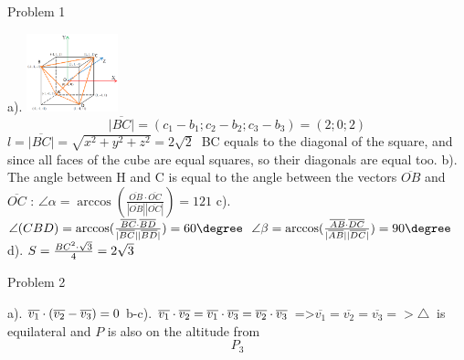 \documentclass[11pt]{article}
\begin{document}
    \begin{center}
        \textrm{Problem 1}
    \end{center}
    \textrm{a).}
    \includegraphics[width=100px]{cube}
    \newline
    \[\overline{|BC|}=(c_{1}-b_{1};c_{2}-b_{2};c_{3}-b_{3})=(2;0;2)\]  \newline
    $ l=\overline{|BC|}=\sqrt{x^2 + y^2 + z^2}=2\sqrt{2}\ $ \newline
    \textrm{BC equals to the diagonal of the square, and since all faces of the cube are equal squares, so their diagonals are equal too.} \newline
    \textrm{b).} \newline
    \textrm{The angle between H and C is equal to the angle between the vectors }$ \overline{OB} $\textrm{ and } $\overline{OC} \textrm{ :} $ \newline
    $ \angle \alpha = \arccos(\frac {\overline{OB}\cdot \overline{OC}} {|\overline{OB}| |\overline{OC}|}) = 121 $ \degree  \newline
    \textrm{c).} \newline
    $\angle (CBD) = \arccos(\frac {\overline{BC}\cdot \overline{BD}}{|\overline{BC}| |\overline{BD}|}) = 60 \degree \newline $
    $\angle \beta = \arccos(\frac {\overline{AB}\cdot \overline{DC}}{|\overline{AB}| |\overline{DC}|}) = 90 \degree \newline $
    \textrm{d).} \newline
    $ S = \frac{BC^2\cdot\sqrt{3}}{4} = 2\sqrt{3} \newline $



    \begin{center}
        \textrm{Problem 2} %
    \end{center}
    \newline
    \textrm{a).} \newline
    $\overline{v_1}\cdot(\overline{v_2}-\overline{v_3})=0 \newline $
    \textrm{b-c).} \newline
    $\overline{v_1}\cdot\overline{v_2}=\overline{v_1}\cdot\overline{v_3}=\overline{v_2}\cdot\overline{v_3} \newline$
    =>$ \overline{v_1}=\overline{v_2}=\overline{v_3} => \triangle\ $ \textrm{ is equilateral and }$ P$ \textrm{ is also on the altitude from } \[P_3\]
\end{document}
